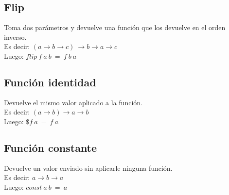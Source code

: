\documentclass[10pt,a4paper]{article}
\begin{document}
\subsection*{Flip}
Toma dos parámetros y devuelve una función que los devuelve en el orden inverso. \\
Es decir: $(a \rightarrow b \rightarrow c) \ \rightarrow b \rightarrow a \rightarrow c$ \\
Luego: $ flip \ f \ a \ b \ = \ f \ b \ a $
\subsection*{Función identidad}
Devuelve el mismo valor aplicado a la función. \\
Es decir: $(a  \rightarrow b)  \rightarrow a \rightarrow b$ \\
Luego: $ \$ f \ a \ = \ f \ a  $
\subsection*{Función constante}
Devuelve un valor enviado sin aplicarle ninguna función. \\
Es decir: $a \rightarrow b \rightarrow a$ \\
Luego: $const \ a \ b \ = \ a$
\end{document}
